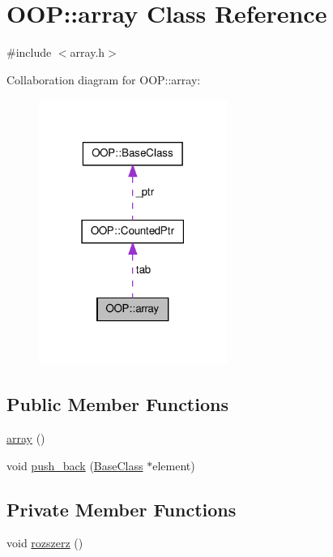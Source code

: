 \hypertarget{classOOP_1_1array}{\section{\-O\-O\-P\-:\-:array \-Class \-Reference}
\label{classOOP_1_1array}
}


{\ttfamily \#include $<$array.\-h$>$}



\-Collaboration diagram for \-O\-O\-P\-:\-:array\-:
\nopagebreak
\begin{figure}[H]
\begin{center}
\leavevmode
\includegraphics[width=174pt]{classOOP_1_1array__coll__graph}
\end{center}
\end{figure}
\subsection*{\-Public \-Member \-Functions}
\begin{DoxyCompactItemize}
\item 
\hyperlink{classOOP_1_1array_a387217686b62bffe5f8aac23569573cb}{array} ()
\item 
void \hyperlink{classOOP_1_1array_aacf55ebc981f43f79f14b6346f9a3104}{push\-\_\-back} (\hyperlink{classOOP_1_1BaseClass}{\-Base\-Class} $\ast$element)
\end{DoxyCompactItemize}
\subsection*{\-Private \-Member \-Functions}
\begin{DoxyCompactItemize}
\item 
void \hyperlink{classOOP_1_1array_ab525b43e208a38c090331d59fc19f72c}{rozszerz} ()
\end{DoxyCompactItemize}

